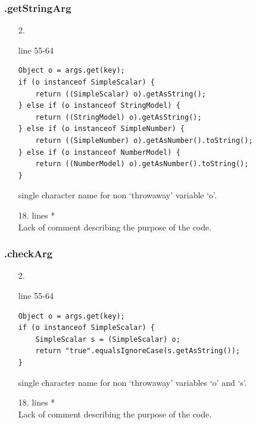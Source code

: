 \documentclass[english]{article}
\begin{document}
\subsubsection*{.getStringArg}
\begin{itemize}

\item[2.]{line 55-64
		\begin{lstlisting} 
Object o = args.get(key);
if (o instanceof SimpleScalar) {
    return ((SimpleScalar) o).getAsString();
} else if (o instanceof StringModel) {
    return ((StringModel) o).getAsString();
} else if (o instanceof SimpleNumber) {
    return ((SimpleNumber) o).getAsNumber().toString();
} else if (o instanceof NumberModel) {
    return ((NumberModel) o).getAsNumber().toString();
}
		\end{lstlisting}
		single character name for non `throwaway'  variable `o'.}


\item[18.]{lines  *\\
		Lack of comment describing the purpose of the code.}
\end{itemize}
\subsubsection*{.checkArg}
\begin{itemize}

\item[2.]{line 55-64
		\begin{lstlisting} 
Object o = args.get(key);
if (o instanceof SimpleScalar) {
    SimpleScalar s = (SimpleScalar) o;
    return "true".equalsIgnoreCase(s.getAsString());
}
		\end{lstlisting}
		single character name for non `throwaway'  variables `o' and `s'.}
\item[18.]{lines  *\\
		Lack of comment describing the purpose of the code.}
\end{itemize}
\end{document}
